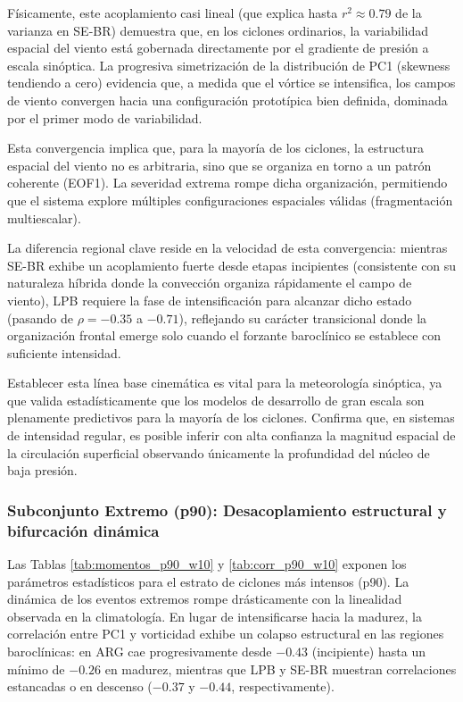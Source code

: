 Físicamente, este acoplamiento casi lineal (que explica hasta $r^2 \approx 0.79$ de la varianza en SE-BR) demuestra que, en los ciclones ordinarios, la variabilidad espacial del viento está gobernada directamente por el gradiente de presión a escala sinóptica. La progresiva simetrización de la distribución de PC1 (skewness tendiendo a cero) evidencia que, a medida que el vórtice se intensifica, los campos de viento convergen hacia una configuración prototípica bien definida, dominada por el primer modo de variabilidad.



Esta convergencia implica que, para la mayoría de los ciclones, la estructura espacial del viento no es arbitraria, sino que se organiza en torno a un patrón coherente (EOF1). La severidad extrema rompe dicha organización, permitiendo que el sistema explore múltiples configuraciones espaciales válidas (fragmentación multiescalar).

La diferencia regional clave reside en la velocidad de esta convergencia: mientras SE-BR exhibe un acoplamiento fuerte desde etapas incipientes (consistente con su naturaleza híbrida donde la convección organiza rápidamente el campo de viento), LPB requiere la fase de intensificación para alcanzar dicho estado (pasando de $\rho = -0.35$ a $-0.71$), reflejando su carácter transicional donde la organización frontal emerge solo cuando el forzante baroclínico se establece con suficiente intensidad.

Establecer esta línea base cinemática es vital para la meteorología sinóptica, ya que valida estadísticamente que los modelos de desarrollo de gran escala son plenamente predictivos para la mayoría de los ciclones. Confirma que, en sistemas de intensidad regular, es posible inferir con alta confianza la magnitud espacial de la circulación superficial observando únicamente la profundidad del núcleo de baja presión.

\subsubsection{Subconjunto Extremo (p90): Desacoplamiento estructural y bifurcación dinámica}

Las Tablas \ref{tab:momentos_p90_w10} y \ref{tab:corr_p90_w10} exponen los parámetros estadísticos para el estrato de ciclones más intensos (p90). La dinámica de los eventos extremos rompe drásticamente con la linealidad observada en la climatología. En lugar de intensificarse hacia la madurez, la correlación entre PC1 y vorticidad exhibe un colapso estructural en las regiones baroclínicas: en ARG cae progresivamente desde $-0.43$ (incipiente) hasta un mínimo de $-0.26$ en madurez, mientras que LPB y SE-BR muestran correlaciones estancadas o en descenso ($-0.37$ y $-0.44$, respectivamente). 

